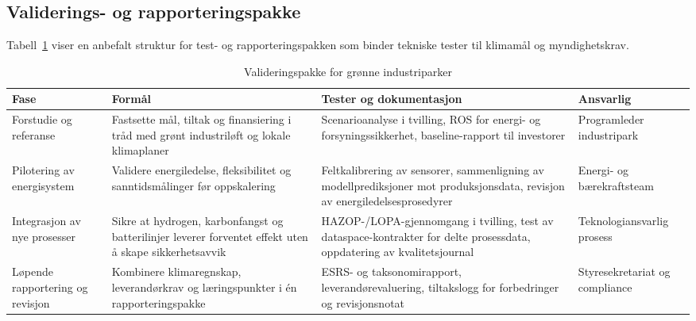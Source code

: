 \subsection{Validerings- og rapporteringspakke}
Tabell~\ref{tab:industripark-validering} viser en anbefalt struktur for test- og rapporteringspakken som binder tekniske tester til klimamål og myndighetskrav.

\begin{table}[htbp]
    \centering
    \caption{Valideringspakke for grønne industriparker}
    \label{tab:industripark-validering}
    \begin{tabular}{|p{3.2cm}|p{4.5cm}|p{4.8cm}|p{3.0cm}|}
        \hline
        \textbf{Fase} & \textbf{Formål} & \textbf{Tester og dokumentasjon} & \textbf{Ansvarlig} \\
        \hline
        Forstudie og referanse & Fastsette mål, tiltak og finansiering i tråd med grønt industriløft og lokale klimaplaner & Scenarioanalyse i tvilling, ROS for energi- og forsyningssikkerhet, baseline-rapport til investorer \citep{regjeringen2023grontindustriloft,moindustripark2024klimaplan} & Programleder industripark \\
        \hline
        Pilotering av energisystem & Validere energiledelse, fleksibilitet og sanntidsmålinger før oppskalering & Feltkalibrering av sensorer, sammenligning av modellprediksjoner mot produksjonsdata, revisjon av energiledelsesprosedyrer \citep{enova2024energiledelse,moindustripark2024klimaplan} & Energi- og bærekraftsteam \\
        \hline
        Integrasjon av nye prosesser & Sikre at hydrogen, karbonfangst og batterilinjer leverer forventet effekt uten å skape sikkerhetsavvik & HAZOP-/LOPA-gjennomgang i tvilling, test av dataspace-kontrakter for delte prosessdata, oppdatering av kvalitetsjournal \citep{heroya2024hydrogenhub} & Teknologiansvarlig prosess \\
        \hline
        Løpende rapportering og revisjon & Kombinere klimaregnskap, leverandørkrav og læringspunkter i én rapporteringspakke & ESRS- og taksonomirapport, leverandørevaluering, tiltakslogg for forbedringer og revisjonsnotat \citep{enova2024energiledelse,eyde2023batteri} & Styresekretariat og compliance \\
        \hline
    \end{tabular}
\end{table}

